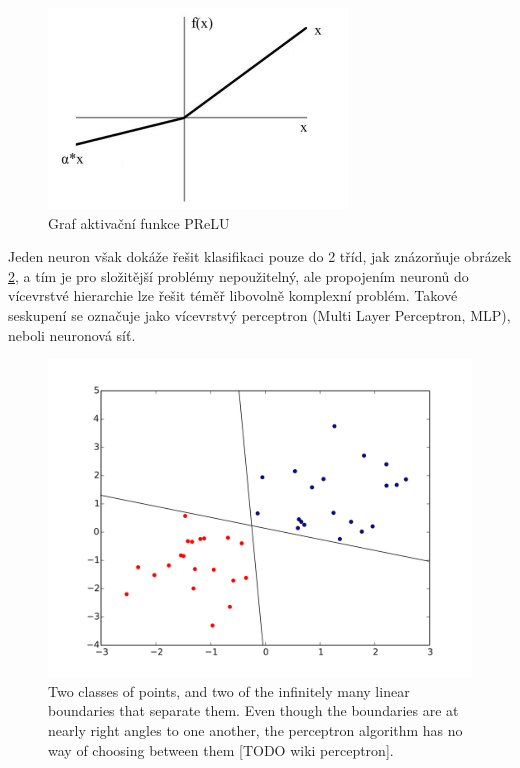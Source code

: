 \begin{figure}[H]
    \centering
    \includegraphics[scale=1.4]{obrazky-figures/prelu.jpg}
    \caption{\label{fig:prelu}Graf aktivační funkce PReLU}
\end{figure}

Jeden neuron však dokáže řešit klasifikaci pouze do 2 tříd, jak znázorňuje obrázek \ref{fig:perceptron_separable}, a tím je pro složitější problémy nepoužitelný, ale propojením neuronů do vícevrstvé hierarchie lze řešit téměř libovolně komplexní problém. Takové seskupení se označuje jako vícevrstvý perceptron (Multi Layer Perceptron, MLP), neboli neuronová síť.

\begin{figure}[H]
    \centering
    \includegraphics[scale=0.35]{obrazky-figures/Perceptron_cant_choose.png}
    \caption{\label{fig:perceptron_separable}Two classes of points, and two of the infinitely many linear boundaries that separate them. Even though the boundaries are at nearly right angles to one another, the perceptron algorithm has no way of choosing between them [TODO wiki perceptron].} 
\end{figure}


